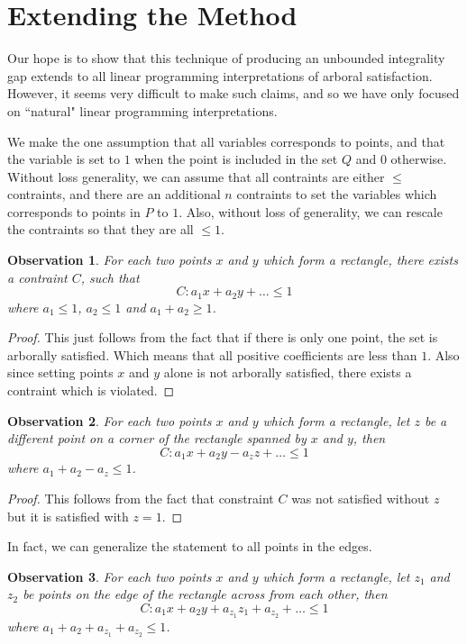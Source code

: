 \documentclass[11pt]{article}
\newtheorem{observation}{Observation}
\begin{document}
\section{Extending the Method}

Our hope is to show that this technique of producing an unbounded integrality gap extends to all linear programming interpretations of arboral satisfaction. However, it seems very difficult to make such claims, and so we have only focused on ``natural" linear programming interpretations.

We make the one assumption that all variables corresponds to points, and that the variable is set to $1$ when the point is included in the set $Q$ and $0$ otherwise. Without loss generality, we can assume that all contraints are either $\leq$ contraints, and there are an additional $n$ contraints to set the variables which corresponds to points in $P$ to $1$. Also, without loss of generality, we can rescale the contraints so that they are all $\leq 1$. 

\begin{observation}
For each two points $x$ and $y$ which form a rectangle, there exists a contraint $C$, such that
\[ C: a_1x + a_2y + \dots \leq 1 \]
where $a_1 \leq 1$, $a_2 \leq 1$ and $a_1 + a_2 \geq 1$. 
\end{observation}

\begin{proof}
This just follows from the fact that if there is only one point, the set is arborally satisfied. Which means that all positive coefficients are less than $1$. Also since setting points $x$ and $y$ alone is not arborally satisfied, there exists a contraint which is violated.
\end{proof}

\begin{observation}
For each two points $x$ and $y$ which form a rectangle, let $z$ be a different point on a corner of the rectangle spanned by $x$ and $y$, then
\[ C: a_1x + a_2y - a_zz + \dots \leq 1 \]
where $a_1 + a_2 - a_z \leq 1$.
\end{observation}

\begin{proof}
This follows from the fact that constraint $C$ was not satisfied without $z$ but it is satisfied with $z = 1$. 
\end{proof}

In fact, we can generalize the statement to all points in the edges.
\begin{observation}
For each two points $x$ and $y$ which form a rectangle, let $z_1$ and $z_2$ be points on the edge of the rectangle across from each other, then
\[ C : a_1x + a_2y + a_{z_1}z_1 + a_{z_2} + \dots \leq 1\]
where $a_1 + a_2 + a_{z_1} + a_{z_2} \leq 1$. 
\end{observation}
\end{document}
